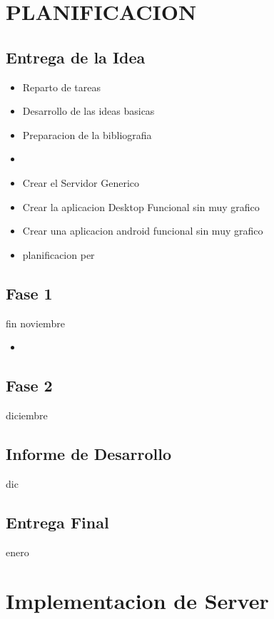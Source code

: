 \documentclass{article}
\theoremstyle{definition}
\begin{document}
\section{PLANIFICACION}

\subsection{Entrega de la Idea}

\begin{itemize}
    \item Reparto de tareas
    \item Desarrollo de las ideas basicas
    \item Preparacion de la bibliografia
    \item 
\end{itemize}

\begin{itemize}
    \item Crear el Servidor Generico
    \item Crear la aplicacion Desktop Funcional sin muy grafico
    \item Crear una aplicacion android funcional sin muy grafico
    \item planificacion per
\end{itemize}
\subsection{Fase 1}
fin noviembre

\begin{itemize}
    \item 
\end{itemize}


\subsection{Fase 2}
diciembre
\subsection{Informe de Desarrollo}
dic
\subsection{Entrega Final}
enero



\section{Implementacion de Server}
\end{document}

